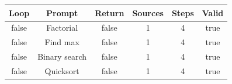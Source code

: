 \begin{table}[h]
\centering
\begin{tabular}{ |c|c|c|c|c|c| }
\hline
Loop & Prompt & Return & Sources & Steps & Valid \\
\hline
false & Factorial & false & 1 & 4 & true \\
\hline
false & Find max & false & 1 & 4 & true \\
\hline
false & Binary search & false & 1 & 4 & true \\
\hline
false & Quicksort & false & 1 & 4 & true \\
\hline
\end{tabular}
\end{table}

